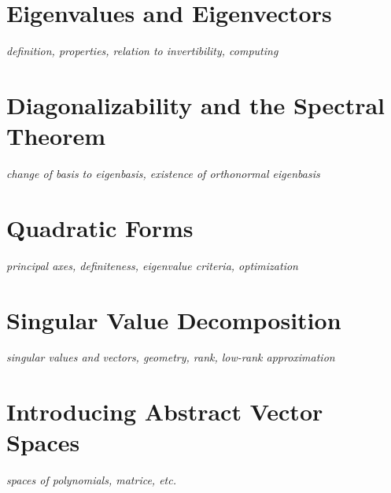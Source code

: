 \documentclass[../../../main.tex]{subfiles}
\begin{document}
\section{Eigenvalues and Eigenvectors}
\textit{definition, properties, relation to invertibility, computing}
\section{Diagonalizability and the Spectral Theorem}
\textit{change of basis to eigenbasis, existence of orthonormal eigenbasis}
\section{Quadratic Forms}
\textit{principal axes, definiteness, eigenvalue criteria, optimization}
\section{Singular Value Decomposition}
\textit{singular values and vectors, geometry, rank, low-rank approximation}
\section{Introducing Abstract Vector Spaces}
\textit{spaces of polynomials, matrice, etc.}

\printbibliography[
    heading=subbibintoc,
    title={References}
]
\end{document}
